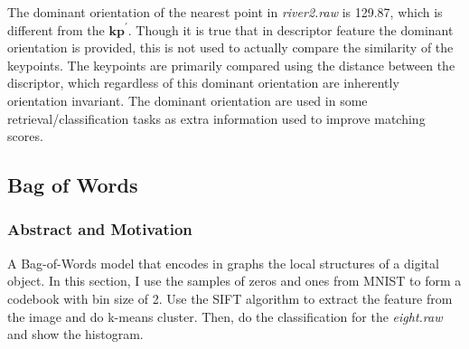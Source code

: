 \documentclass[11pt]{article}
\newcommand{\vct}[1]{\bm{#1}}
\begin{document}
The dominant orientation of the nearest point in {\it river2.raw} is 129.87, which is different from the $\vct {kp}^{ ' }$. Though it is true that in descriptor feature the dominant orientation is provided, this is not used to actually compare the similarity of the keypoints. The keypoints are primarily compared using the distance between the discriptor, which regardless of this dominant orientation are inherently orientation invariant. The dominant orientation are used in some retrieval/classification tasks as extra information used to improve matching scores.


\subsection{Bag of Words}
\subsubsection{Abstract and Motivation}
A Bag-of-Words model that encodes in graphs the local structures of a digital object. In this section, I use the samples of zeros and ones from MNIST to form a codebook with bin size of 2. Use the SIFT algorithm to extract the feature from the image and do k-means cluster. Then, do the classification for the {\it eight.raw} and show the histogram.
\end{document}
